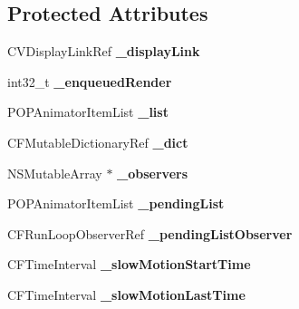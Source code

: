 \subsection*{Protected Attributes}
\begin{DoxyCompactItemize}
\item 
\mbox{\label{interface_p_o_p_animator_a2d4ab132b67ab9d116973a817cf45d37}} 
C\+V\+Display\+Link\+Ref {\bfseries \+\_\+display\+Link}
\item 
\mbox{\label{interface_p_o_p_animator_a9d3e9d0b22234e104d61c25392521f61}} 
int32\+\_\+t {\bfseries \+\_\+enqueued\+Render}
\item 
\mbox{\label{interface_p_o_p_animator_a370f393eeec7ba7b5bdabfe668533100}} 
P\+O\+P\+Animator\+Item\+List {\bfseries \+\_\+list}
\item 
\mbox{\label{interface_p_o_p_animator_acf4fe29dc14e44cd8130244db5cbad3c}} 
C\+F\+Mutable\+Dictionary\+Ref {\bfseries \+\_\+dict}
\item 
\mbox{\label{interface_p_o_p_animator_a0c81b8054d398f4023a17e45c5424a09}} 
N\+S\+Mutable\+Array $\ast$ {\bfseries \+\_\+observers}
\item 
\mbox{\label{interface_p_o_p_animator_ad3c7fb9e88fcc9b3f86ee9ab34459647}} 
P\+O\+P\+Animator\+Item\+List {\bfseries \+\_\+pending\+List}
\item 
\mbox{\label{interface_p_o_p_animator_afb965bee34078c30e6ac0d82d54101ff}} 
C\+F\+Run\+Loop\+Observer\+Ref {\bfseries \+\_\+pending\+List\+Observer}
\item 
\mbox{\label{interface_p_o_p_animator_a04eba05988bd43cea8863403e054f1be}} 
C\+F\+Time\+Interval {\bfseries \+\_\+slow\+Motion\+Start\+Time}
\item 
\mbox{\label{interface_p_o_p_animator_a3fd5c3335b5f8d4957b521afb740a1ab}} 
C\+F\+Time\+Interval {\bfseries \+\_\+slow\+Motion\+Last\+Time}
\item 
\mbox{\label{interface_p_o_p_animator_a2a8a42816c10678aaddad11ccd102eca}} 

\end{DoxyCompactItemize}
